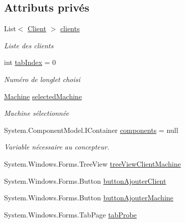 \subsection*{Attributs privés}
\begin{DoxyCompactItemize}
\item 
List$<$ \mbox{\hyperlink{class_m_t_connect_agent_1_1_model_1_1_client}{Client}} $>$ \mbox{\hyperlink{class_m_t_connect_agent_1_1_form_main_a09ffacfbac9fad30a140bd11b36577a5}{clients}}
\begin{DoxyCompactList}\small\item\em Liste des clients \end{DoxyCompactList}\item 
int \mbox{\hyperlink{class_m_t_connect_agent_1_1_form_main_aa1f34402faaa02cad5c6c8028ff4e633}{tab\+Index}} = 0
\begin{DoxyCompactList}\small\item\em Numéro de l\textquotesingle{}onglet choisi \end{DoxyCompactList}\item 
\mbox{\hyperlink{class_m_t_connect_agent_1_1_model_1_1_machine}{Machine}} \mbox{\hyperlink{class_m_t_connect_agent_1_1_form_main_a0baaf0dbbac66a3914652ce754f2398b}{selected\+Machine}}
\begin{DoxyCompactList}\small\item\em Machine sélectionnée \end{DoxyCompactList}\item 
System.\+Component\+Model.\+I\+Container \mbox{\hyperlink{class_m_t_connect_agent_1_1_form_main_a5d0fbfe75eb79bdc22e0d262fdc18ff2}{components}} = null
\begin{DoxyCompactList}\small\item\em Variable nécessaire au concepteur. \end{DoxyCompactList}\item 
System.\+Windows.\+Forms.\+Tree\+View \mbox{\hyperlink{class_m_t_connect_agent_1_1_form_main_addc30e71091a6b662653b36b6ba182a9}{tree\+View\+Client\+Machine}}
\item 
System.\+Windows.\+Forms.\+Button \mbox{\hyperlink{class_m_t_connect_agent_1_1_form_main_ab4d2bcf24db1f9edcb05988105c85ddf}{button\+Ajouter\+Client}}
\item 
System.\+Windows.\+Forms.\+Button \mbox{\hyperlink{class_m_t_connect_agent_1_1_form_main_a71bcb0b19ed0dae8dce1f61723f68f12}{button\+Ajouter\+Machine}}
\item 
System.\+Windows.\+Forms.\+Tab\+Page \mbox{\hyperlink{class_m_t_connect_agent_1_1_form_main_a75b27d8a3abec3df92d20d4154084624}{tab\+Probe}}

\end{DoxyCompactItemize}
